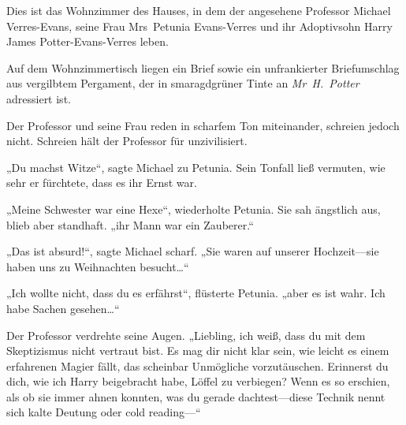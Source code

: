 Dies ist das Wohnzimmer des Hauses, in dem der angesehene Professor Michael Verres-Evans, seine Frau Mrs~Petunia Evans-Verres und ihr Adoptivsohn Harry James Potter-Evans-Verres leben.

Auf dem Wohnzimmertisch liegen ein Brief sowie ein unfrankierter Briefumschlag aus vergilbtem Pergament, der in smaragdgrüner Tinte an \emph{Mr~H.~Potter} adressiert ist.

Der Professor und seine Frau reden in scharfem Ton miteinander, schreien jedoch nicht. Schreien hält der Professor für unzivilisiert.

„Du machst Witze“, sagte Michael zu Petunia. Sein Tonfall ließ vermuten, wie sehr er fürchtete, dass es ihr Ernst war.

„Meine Schwester war eine Hexe“, wiederholte Petunia. Sie sah ängstlich aus, blieb aber standhaft. „ihr Mann war ein Zauberer.“

„Das ist absurd!“, sagte Michael scharf. „Sie waren auf unserer Hochzeit—sie haben uns zu Weihnachten besucht…“

„Ich wollte nicht, dass du es erfährst“, flüsterte Petunia. „aber es ist wahr. Ich habe Sachen gesehen…“

Der Professor verdrehte seine Augen. „Liebling, ich weiß, dass du mit dem Skeptizismus nicht vertraut bist. Es mag dir nicht klar sein, wie leicht es einem erfahrenen Magier fällt, das scheinbar Unmögliche vorzutäuschen. Erinnerst du dich, wie ich Harry beigebracht habe, Löffel zu verbiegen? Wenn es so erschien, als ob sie immer ahnen konnten, was du gerade dachtest—diese Technik nennt sich kalte Deutung oder cold reading—“

